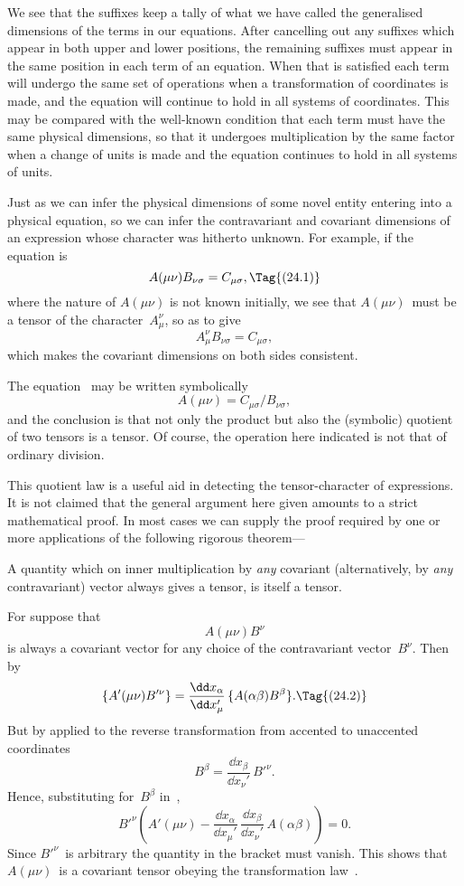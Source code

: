 \documentclass[12pt]{book}
\begin{document}
We see that the suffixes keep a tally of what we have called the generalised
dimensions of the terms in our equations. After cancelling out any suffixes
which appear in both upper and lower positions, the remaining suffixes must
appear in the same position in each term of an equation. When that is
satisfied each term will undergo the same set of operations when a transformation
of coordinates is made, and the equation will continue to hold in all
systems of coordinates. This may be compared with the well-known condition
that each term must have the same physical dimensions, so that it undergoes
multiplication by the same factor when a change of units is made and the
equation continues to hold in all systems of units.

Just as we can infer the physical dimensions of some novel entity entering
%
%
into a physical equation, so we can infer the contravariant and covariant
dimensions of an expression whose character was hitherto unknown. For
example, if the equation is
\[
A(\mu\nu) B_{\nu\sigma} = C_{\mu\sigma},
\Tag{(24.1)}
\]
where the nature of $A(\mu\nu)$ is not known initially, we see that $A(\mu\nu)$~must
be a tensor of the character~$A_{\mu}^{\nu}$, so as to give
\[
A_{\mu}^{\nu} B_{\nu\sigma} = C_{\mu\sigma},
\]
which makes the covariant dimensions on both sides consistent.

The equation~ may be written symbolically
\[
A(\mu\nu) = C_{\mu\sigma}/B_{\nu\sigma},
\]
and the conclusion is that not only the product but also the (symbolic)
quotient of two tensors is a tensor. Of course, the operation here indicated
is not that of ordinary division.

This quotient law is a useful aid in detecting the tensor-character of
%
expressions. It is not claimed that the general argument here given amounts
to a strict mathematical proof. In most cases we can supply the proof required
by one or more applications of the following rigorous theorem---

A quantity which on inner multiplication by \emph{any} covariant (alternatively,
by \emph{any} contravariant) vector always gives a tensor, is itself a tensor.

For suppose that
\[
A(\mu\nu) B^{\nu}
\]
is always a covariant vector for any choice of the contravariant vector~$B^{\nu}$.
Then by~
\[
\{A'(\mu\nu) B'^{\nu}\}
  = \frac{\dd x_{\alpha}}{\dd x_{\mu}'}\, \{A(\alpha\beta) B^{\beta}\}.
\Tag{(24.2)}
\]
But by  applied to the reverse transformation from accented to unaccented
coordinates
\[
B^{\beta} = \frac{\dd x_{\beta}}{\dd x_{\nu}'}\, B'^{\nu}.
\]
Hence, substituting for~$B^{\beta}$ in~,
\[
B'^{\nu} \left(A'(\mu\nu) - \frac{\dd x_{\alpha}}{\dd x_{\mu}'}\, \frac{\dd x_{\beta}}{\dd x_{\nu}'}\, A(\alpha\beta)\right) = 0.
\]
Since $B'^{\nu}$~is arbitrary the quantity in the bracket must vanish. This shows
that $A(\mu\nu)$~is a covariant tensor obeying the transformation law~.
\end{document}
